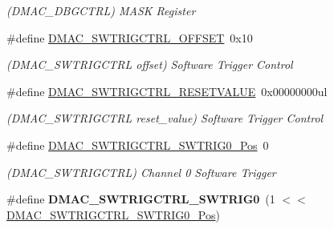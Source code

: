 \begin{DoxyCompactItemize}
\begin{DoxyCompactList}\small\item\em (D\+M\+A\+C\+\_\+\+D\+B\+G\+C\+T\+R\+L) M\+A\+S\+K Register \end{DoxyCompactList}\item 
\hypertarget{group___s_a_m_l21___d_m_a_c_gace5988da0a3f697805e2a9205d3963e0}{}\#define \hyperlink{group___s_a_m_l21___d_m_a_c_gace5988da0a3f697805e2a9205d3963e0}{D\+M\+A\+C\+\_\+\+S\+W\+T\+R\+I\+G\+C\+T\+R\+L\+\_\+\+O\+F\+F\+S\+E\+T}~0x10\label{group___s_a_m_l21___d_m_a_c_gace5988da0a3f697805e2a9205d3963e0}

\begin{DoxyCompactList}\small\item\em (D\+M\+A\+C\+\_\+\+S\+W\+T\+R\+I\+G\+C\+T\+R\+L offset) Software Trigger Control \end{DoxyCompactList}\item 
\hypertarget{group___s_a_m_l21___d_m_a_c_gab52b851262eb3597523333ee2b75b163}{}\#define \hyperlink{group___s_a_m_l21___d_m_a_c_gab52b851262eb3597523333ee2b75b163}{D\+M\+A\+C\+\_\+\+S\+W\+T\+R\+I\+G\+C\+T\+R\+L\+\_\+\+R\+E\+S\+E\+T\+V\+A\+L\+U\+E}~0x00000000ul\label{group___s_a_m_l21___d_m_a_c_gab52b851262eb3597523333ee2b75b163}

\begin{DoxyCompactList}\small\item\em (D\+M\+A\+C\+\_\+\+S\+W\+T\+R\+I\+G\+C\+T\+R\+L reset\+\_\+value) Software Trigger Control \end{DoxyCompactList}\item 
\hypertarget{group___s_a_m_l21___d_m_a_c_gac692afd8f8afd92c9d7c8f0ff694e442}{}\#define \hyperlink{group___s_a_m_l21___d_m_a_c_gac692afd8f8afd92c9d7c8f0ff694e442}{D\+M\+A\+C\+\_\+\+S\+W\+T\+R\+I\+G\+C\+T\+R\+L\+\_\+\+S\+W\+T\+R\+I\+G0\+\_\+\+Pos}~0\label{group___s_a_m_l21___d_m_a_c_gac692afd8f8afd92c9d7c8f0ff694e442}

\begin{DoxyCompactList}\small\item\em (D\+M\+A\+C\+\_\+\+S\+W\+T\+R\+I\+G\+C\+T\+R\+L) Channel 0 Software Trigger \end{DoxyCompactList}\item 
\hypertarget{group___s_a_m_l21___d_m_a_c_ga41aa8d1dce2de9342e1154eb873e07a9}{}\#define {\bfseries D\+M\+A\+C\+\_\+\+S\+W\+T\+R\+I\+G\+C\+T\+R\+L\+\_\+\+S\+W\+T\+R\+I\+G0}~(1 $<$$<$ \hyperlink{group___s_a_m_l21___d_m_a_c_gac692afd8f8afd92c9d7c8f0ff694e442}{D\+M\+A\+C\+\_\+\+S\+W\+T\+R\+I\+G\+C\+T\+R\+L\+\_\+\+S\+W\+T\+R\+I\+G0\+\_\+\+Pos})\label{group___s_a_m_l21___d_m_a_c_ga41aa8d1dce2de9342e1154eb873e07a9}


\end{DoxyCompactItemize}

